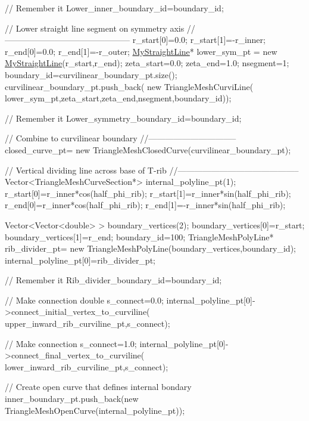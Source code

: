 \begin{DoxyCodeInclude}
 \textcolor{comment}{// Remember it}
 Lower\_inner\_boundary\_id=boundary\_id;

 \textcolor{comment}{// Lower straight line segment on symmetry axis}
 \textcolor{comment}{//---------------------------------------------}
 r\_start[0]=0.0;
 r\_start[1]=-r\_inner;
 r\_end[0]=0.0;
 r\_end[1]=-r\_outer;
 \hyperlink{classMyStraightLine}{MyStraightLine}* lower\_sym\_pt = \textcolor{keyword}{new} \hyperlink{classMyStraightLine}{MyStraightLine}(r\_start,r\_end);
 zeta\_start=0.0;
 zeta\_end=1.0;
 nsegment=1;
 boundary\_id=curvilinear\_boundary\_pt.size();
 curvilinear\_boundary\_pt.push\_back(
  \textcolor{keyword}{new} TriangleMeshCurviLine(
   lower\_sym\_pt,zeta\_start,zeta\_end,nsegment,boundary\_id));
      
 \textcolor{comment}{// Remember it}
 Lower\_symmetry\_boundary\_id=boundary\_id;

 \textcolor{comment}{// Combine to curvilinear boundary}
 \textcolor{comment}{//--------------------------------}
 closed\_curve\_pt=
  \textcolor{keyword}{new} TriangleMeshClosedCurve(curvilinear\_boundary\_pt); 
 
 \textcolor{comment}{// Vertical dividing line across base of T-rib}
 \textcolor{comment}{//--------------------------------------------}
 Vector<TriangleMeshCurveSection*> internal\_polyline\_pt(1);
 r\_start[0]=r\_inner*cos(half\_phi\_rib);
 r\_start[1]=r\_inner*sin(half\_phi\_rib);
 r\_end[0]=r\_inner*cos(half\_phi\_rib);
 r\_end[1]=-r\_inner*sin(half\_phi\_rib);

 Vector<Vector<double> > boundary\_vertices(2);
 boundary\_vertices[0]=r\_start;
 boundary\_vertices[1]=r\_end;
 boundary\_id=100;
 TriangleMeshPolyLine* rib\_divider\_pt=
  \textcolor{keyword}{new} TriangleMeshPolyLine(boundary\_vertices,boundary\_id); 
 internal\_polyline\_pt[0]=rib\_divider\_pt;

 \textcolor{comment}{// Remember it}
 Rib\_divider\_boundary\_id=boundary\_id;

 \textcolor{comment}{// Make connection}
 \textcolor{keywordtype}{double} s\_connect=0.0;
 internal\_polyline\_pt[0]->connect\_initial\_vertex\_to\_curviline(
  upper\_inward\_rib\_curviline\_pt,s\_connect);

 \textcolor{comment}{// Make connection}
 s\_connect=1.0;
 internal\_polyline\_pt[0]->connect\_final\_vertex\_to\_curviline(
  lower\_inward\_rib\_curviline\_pt,s\_connect);

 \textcolor{comment}{// Create open curve that defines internal bondary}
 inner\_boundary\_pt.push\_back(\textcolor{keyword}{new} TriangleMeshOpenCurve(internal\_polyline\_pt));
 

\end{DoxyCodeInclude}
